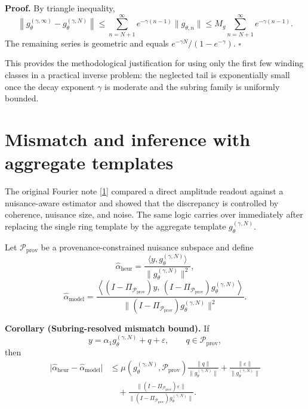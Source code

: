 \documentclass[10pt,letterpaper,twocolumn]{article}
\begin{document}
\par\smallskip\noindent\textbf{Proof.} By triangle inequality,
\[
\left\|g_\theta^{(\gamma,\infty)} - g_\theta^{(\gamma,N)}\right\|
\le
\sum_{n=N+1}^{\infty} e^{-\gamma(n-1)} \|g_{\theta,n}\|
\le
M_g \sum_{n=N+1}^{\infty} e^{-\gamma(n-1)}.
\]
The remaining series is geometric and equals $e^{-\gamma N}/(1-e^{-\gamma})$.
\hfill$\square$

This provides the methodological justification for using only the first few winding classes in a practical inverse problem: the neglected tail is exponentially small once the decay exponent $\gamma$ is moderate and the subring family is uniformly bounded.

\section{Mismatch and inference with aggregate templates}

The original Fourier note [\hyperlink{ref-1}{1}] compared a direct amplitude readout against a nuisance-aware estimator and showed that the discrepancy is controlled by coherence, nuisance size, and noise. The same logic carries over immediately after replacing the single ring template by the aggregate template $g_\theta^{(\gamma,N)}$.

Let $\mathcal P_{\mathrm{prov}}$ be a provenance-constrained nuisance subspace and define
\[
\hat\alpha_{\mathrm{heur}}
=
\frac{\langle y,g_\theta^{(\gamma,N)}\rangle}{\|g_\theta^{(\gamma,N)}\|^2},
\]
\[
\hat\alpha_{\mathrm{model}}
=
\frac{\left\langle (I-\Pi_{\mathcal P_{\mathrm{prov}}})y,\, (I-\Pi_{\mathcal P_{\mathrm{prov}}})g_\theta^{(\gamma,N)}\right\rangle}{\|(I-\Pi_{\mathcal P_{\mathrm{prov}}})g_\theta^{(\gamma,N)}\|^2}.
\]

\par\smallskip\noindent\textbf{Corollary (Subring-resolved mismatch bound).} If
\[
y = \alpha_1 g_\theta^{(\gamma,N)} + q + \varepsilon,
\qquad q\in\mathcal P_{\mathrm{prov}},
\]
then
\[
\begin{aligned}
\bigl|\hat\alpha_{\mathrm{heur}}-\hat\alpha_{\mathrm{model}}\bigr|
&\le
\mu\!\left(g_\theta^{(\gamma,N)},\mathcal P_{\mathrm{prov}}\right)
\frac{\|q\|}{\|g_\theta^{(\gamma,N)}\|}
+
\frac{\|\varepsilon\|}{\|g_\theta^{(\gamma,N)}\|} \\
&\quad+
\frac{\|(I-\Pi_{\mathcal P_{\mathrm{prov}}})\varepsilon\|}{\|(I-\Pi_{\mathcal P_{\mathrm{prov}}})g_\theta^{(\gamma,N)}\|}.
\end{aligned}
\]
\end{document}
